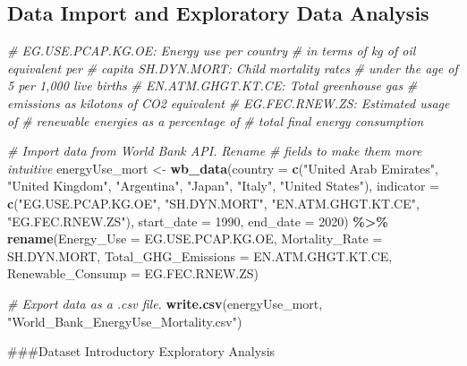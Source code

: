 \documentclass[
]{article}
\newenvironment{Shaded}{\begin{snugshade}}{\end{snugshade}}
\newcommand{\AttributeTok}[1]{\textcolor[rgb]{0.13,0.29,0.53}{#1}}
\newcommand{\CommentTok}[1]{\textcolor[rgb]{0.56,0.35,0.01}{\textit{#1}}}
\newcommand{\DecValTok}[1]{\textcolor[rgb]{0.00,0.00,0.81}{#1}}
\newcommand{\FunctionTok}[1]{\textcolor[rgb]{0.13,0.29,0.53}{\textbf{#1}}}
\newcommand{\NormalTok}[1]{#1}
\newcommand{\OtherTok}[1]{\textcolor[rgb]{0.56,0.35,0.01}{#1}}
\newcommand{\SpecialCharTok}[1]{\textcolor[rgb]{0.81,0.36,0.00}{\textbf{#1}}}
\newcommand{\StringTok}[1]{\textcolor[rgb]{0.31,0.60,0.02}{#1}}
\begin{document}
\hypertarget{data-import-and-exploratory-data-analysis}{%
\subsection{Data Import and Exploratory Data
Analysis}\label{data-import-and-exploratory-data-analysis}}

\begin{Shaded}
\begin{Highlighting}[]
\CommentTok{\# EG.USE.PCAP.KG.OE: Energy use per country}
\CommentTok{\# in terms of kg of oil equivalent per}
\CommentTok{\# capita SH.DYN.MORT: Child mortality rates}
\CommentTok{\# under the age of 5 per 1,000 live births}
\CommentTok{\# EN.ATM.GHGT.KT.CE: Total greenhouse gas}
\CommentTok{\# emissions as kilotons of CO2 equivalent}
\CommentTok{\# EG.FEC.RNEW.ZS: Estimated usage of}
\CommentTok{\# renewable energies as a percentage of}
\CommentTok{\# total final energy consumption}

\CommentTok{\# Import data from World Bank API. Rename}
\CommentTok{\# fields to make them more intuitive}
\NormalTok{energyUse\_mort }\OtherTok{\textless{}{-}} \FunctionTok{wb\_data}\NormalTok{(}\AttributeTok{country =} \FunctionTok{c}\NormalTok{(}\StringTok{"United Arab Emirates"}\NormalTok{,}
    \StringTok{"United Kingdom"}\NormalTok{, }\StringTok{"Argentina"}\NormalTok{, }\StringTok{"Japan"}\NormalTok{, }\StringTok{"Italy"}\NormalTok{,}
    \StringTok{"United States"}\NormalTok{), }\AttributeTok{indicator =} \FunctionTok{c}\NormalTok{(}\StringTok{"EG.USE.PCAP.KG.OE"}\NormalTok{,}
    \StringTok{"SH.DYN.MORT"}\NormalTok{, }\StringTok{"EN.ATM.GHGT.KT.CE"}\NormalTok{, }\StringTok{"EG.FEC.RNEW.ZS"}\NormalTok{),}
    \AttributeTok{start\_date =} \DecValTok{1990}\NormalTok{, }\AttributeTok{end\_date =} \DecValTok{2020}\NormalTok{) }\SpecialCharTok{\%\textgreater{}\%}
    \FunctionTok{rename}\NormalTok{(}\AttributeTok{Energy\_Use =}\NormalTok{ EG.USE.PCAP.KG.OE, }\AttributeTok{Mortality\_Rate =}\NormalTok{ SH.DYN.MORT,}
        \AttributeTok{Total\_GHG\_Emissions =}\NormalTok{ EN.ATM.GHGT.KT.CE,}
        \AttributeTok{Renewable\_Consump =}\NormalTok{ EG.FEC.RNEW.ZS)}

\CommentTok{\# Export data as a .csv file.}
\FunctionTok{write.csv}\NormalTok{(energyUse\_mort, }\StringTok{"World\_Bank\_EnergyUse\_Mortality.csv"}\NormalTok{)}
\end{Highlighting}
\end{Shaded}

\#\#\#Dataset Introductory Exploratory Analysis
\end{document}
